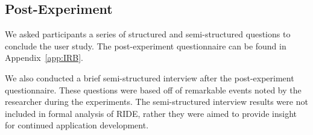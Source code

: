 
\subsection{Post-Experiment} %
\label{sub:post_experiment}
We asked participants a series of structured and semi-structured questions to conclude the user study. The post-experiment questionnaire can be found in Appendix~\ref{app:IRB}.

We also conducted a brief semi-structured interview after the post-experiment questionnaire. These questions were based off of remarkable events noted by the researcher during the experiments. The semi-structured interview results were not included in formal analysis of RIDE, rather they were aimed to provide insight for continued application development.
